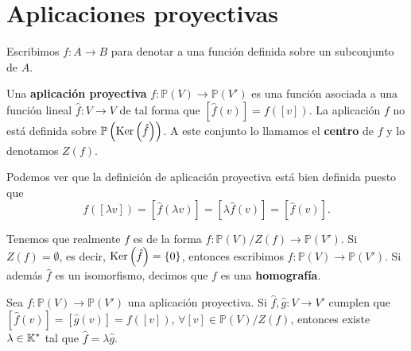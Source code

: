 \section{Aplicaciones proyectivas}
Escribimos $\displaystyle f : A \to B $ para denotar a una función definida sobre un subconjunto de $\displaystyle A $. 
\begin{definition}
	Una \textbf{aplicación proyectiva} $\displaystyle f : \mathbb{P}\left(V\right) \to \mathbb{P}\left(V'\right) $ es una función asociada a una función lineal $\displaystyle \hat{f}: V \to V $ de tal forma que $\displaystyle [\hat{f}(v)] = f\left([v]\right) $. La aplicación $\displaystyle f $ no está definida sobre $\displaystyle \mathbb{P}\left(\operatorname{Ker}\left(\hat{f}\right)\right) $. A este conjunto lo llamamos el \textbf{centro} de $\displaystyle f $ y lo denotamos $\displaystyle Z\left(f\right) $. 
\end{definition}
\begin{observation}
Podemos ver que la definición de aplicación proyectiva está bien definida puesto que 
\[f\left([\lambda v]\right) = \left[\hat{f}\left(\lambda v\right)\right] = \left[\lambda \hat{f}\left(v\right)\right] = \left[\hat{f}\left(v\right)\right]  .\]
\end{observation}
\begin{observation}
	Tenemos que realmente $\displaystyle f $ es de la forma $\displaystyle f : \mathbb{P}\left(V\right)/Z\left(f\right) \to \mathbb{P}\left(V'\right) $. Si $\displaystyle Z\left(f\right) = \emptyset $, es decir, $\displaystyle \operatorname{Ker}\left(\hat{f}\right) = \left\{ 0\right\}  $, entonces escribimos $\displaystyle f : \mathbb{P}\left(V\right) \to \mathbb{P}\left(V'\right) $. 
	Si además $\displaystyle \hat{f} $ es un isomorfismo, decimos que $\displaystyle f $ es una \textbf{homografía}. 
\end{observation}
\begin{prop}
	Sea $\displaystyle f : \mathbb{P}\left(V\right) \to \mathbb{P}\left(V'\right) $ una aplicación proyectiva. Si $\displaystyle \hat{f},\hat{g} : V \to V' $ cumplen que $\displaystyle \left[\hat{f}\left(v\right)\right]  = \left[\hat{g}\left(v\right)\right] = f\left([v]\right)$, $\displaystyle \forall [v] \in \mathbb{P}\left(V\right)/Z\left(f\right) $, entonces existe $\displaystyle \lambda \in \mathbb{K}^{*} $ tal que $\displaystyle \hat{f} = \lambda \hat{g} $.
\end{prop}
